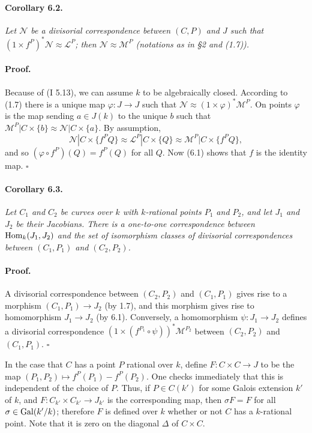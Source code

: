 \paragraph{Corollary 6.2.}
\textit{Let $\mathcal{N}$ be a divisorial correspondence between $(C, P)$ and
$J$ such that $(1 \times f^P)^* \mathcal{N} \approx \mathcal{L}^P$; then
$\mathcal{N} \approx \mathcal{M}^P$ (notations as in \S 2 and (1.7)).}

\paragraph{Proof.}
Because of (I 5.13), we can assume $k$ to be algebraically closed. According
to (1.7) there is a unique map $\varphi \colon J \to J$ such that
$\mathcal{N} \approx (1 \times \varphi)^* \mathcal{M}^P$. On points $\varphi$
is the map sending $a \in J(k)$ to the unique $b$ such that
$\mathcal{M}^P | C \times \{b\} \approx \mathcal{N} | C \times \{a\}$. By
assumption,
\[
  \mathcal{N} | C \times \{f^P Q\}
  \approx \mathcal{L}^P | C \times \{Q\}
  \approx \mathcal{M}^P | C \times \{f^P Q\},
\]
and so $(\varphi \circ f^P)(Q) = f^P(Q)$ for all $Q$. Now (6.1) shows that
$f$ is the identity map. %
\hfill $\square$

\paragraph{Corollary 6.3.}
\textit{Let $C_1$ and $C_2$ be curves over $k$ with $k$-rational points $P_1$
and $P_2$, and let $J_1$ and $J_2$ be their Jacobians. There is a one-to-one
correspondence between $\operatorname{Hom}_k(J_1, J_2)$ and the set of isomorphism classes
of divisorial correspondences between $(C_1, P_1)$ and $(C_2, P_2)$.}

\paragraph{Proof.}
A divisorial correspondence between $(C_2, P_2)$ and $(C_1, P_1)$ gives rise
to a morphism $(C_1, P_1) \to J_2$ (by 1.7), and this morphism gives rise to
homomorphism $J_1 \to J_2$ (by 6.1). %
Conversely, a homomorphism $\psi \colon J_1 \to J_2$ defines a divisorial
correspondence $(1 \times (f^{P_1} \circ \psi))^* \mathcal{M}^{P_2}$ between
$(C_2, P_2)$ and $(C_1, P_1)$.
\hfill $\square$

In the case that $C$ has a point $P$ rational over $k$, define
$F \colon C \times C \to J$ to be the map
$(P_1, P_2) \mapsto f^P(P_1) - f^P(P_2)$. One checks immediately that this is
independent of the choice of $P$. Thus, if $P \in C(k')$ for some Galois
extension $k'$ of $k$, and $F \colon C_{k'} \times C_{k'} \to J_{k'}$ is the
corresponding map, then $\sigma F = F$ for all
$\sigma \in \operatorname{Gal}(k'/k)$; therefore $F$ is defined over $k$ whether or not $C$
has a $k$-rational point. Note that it is zero on the diagonal $\Delta$ of
$C \times C$.

